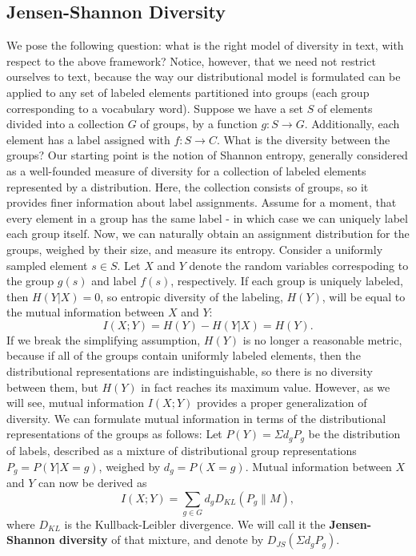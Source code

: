 \subsection{Jensen-Shannon Diversity}
\label{sec:jensen-shannon-divergence}
We pose the following question: what is the right model of diversity
in text, with respect to the above framework? Notice, however, that we
need not restrict ourselves to text, because the way our
distributional model is formulated can be applied to any set of
labeled elements partitioned into groups (each group corresponding to
a vocabulary word). Suppose we have a set $S$ of elements divided into
a collection $G$ of groups, by a function $g:S\rightarrow
G$. Additionally, each element has a label assigned with
$f:S\rightarrow C$. What is the diversity between the groups? Our
starting point is the notion of Shannon 
entropy, generally considered as a well-founded measure of diversity 
for a collection of labeled elements represented by a
distribution. Here, the collection consists of groups, so it provides
finer information about label assignments. Assume for a moment, that
every element in a group has the same label - in which case we can
uniquely label each group itself. Now, we can naturally obtain an
assignment distribution for the groups, weighed by their size, and
measure its entropy. Consider a uniformly sampled element $s\in
S$. Let $X$ and $Y$ denote the random variables correspoding to the
group $g(s)$ and label $f(s)$, respectively. If each group is uniquely
labeled, then $H(Y|X)=0$, so entropic diversity of the
labeling, $H(Y)$, will be equal to the mutual information between $X$
and $Y$: 
\[I(X;Y) = H(Y) - H(Y|X) =H(Y).\]
If we break the simplifying assumption, $H(Y)$ is no longer a
reasonable metric, because if all of the groups contain uniformly
labeled elements, then the distributional representations are
indistinguishable, so there is no diversity between them, but $H(Y)$
in fact reaches its maximum value. However, as we will see, mutual
information $I(X;Y)$ provides a proper generalization of diversity. We
can formulate mutual information in terms of the distributional
representations of the groups as follows:
\bep\label{mixture}
Let $P(Y)=\Sigma d_g P_g$ be the distribution of labels,
described as a mixture of distributional group representations
$P_g=P(Y|X=g)$, weighed by $d_g=P(X=g)$. Mutual information between
$X$ and $Y$ can now be derived as
\[ I(X;Y)= \sum_{g\in G} d_g D_{KL}(P_g\|M),\]
where $D_{KL}$ is the Kullback-Leibler divergence.
We will call it the {\bf Jensen-Shannon diversity} of that
mixture, and denote by $D_{JS}(\Sigma d_gP_g)$.
\eep

